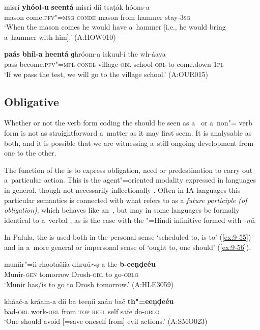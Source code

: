 \begin{exe}
\ex
\label{ex:9-53}
\gll misrí \textbf{yhóol-u} \textbf{seentá} misrí díi tsaṭák hóons-a \\
mason come.\textsc{pfv"=msg} \textsc{condh} mason from hammer stay-\textsc{3sg} \\
\glt `When the mason comes he would have a~hammer [i.e., he would bring a~hammer with him].' (A:HOW010)

\ex
\label{ex:9-54}
\gll \textbf{paás} \textbf{bhíl-a} \textbf{heentá}  ɡhróom-a iskuul-í the wh-áaya\\
pass become.\textsc{pfv"=mpl} \textsc{condl}  village-\textsc{obl} school-\textsc{obl} to come.down-\textsc{1pl}\\
\glt `If we pass the test, we will go to the village school.' (A:OUR015)
\end{exe}

\subsection{Obligative}
\label{subsec:9-2-3}

Whether or not the verb form coding the  should be seen as a~ or a~non"= verb form is not as straightforward a~matter as it may first seem. It is analysable as both, and it is possible that we are witnessing a~still ongoing development from one to the other. 



The function of the  is to express obligation, need or predestination to carry out a~particular action. This is the agent"=oriented modality expressed in languages in general, though not necessarily inflectionally \citep[177--187]{bybeeetal1994}. Often in IA languages this particular semantics is connected with what \citet[322]{masica1991} refers to as a \textit{future  participle (of obligation)}, which behaves like an~, but may in some languages be formally identical to a~verbal , as is the case with the \iliUrdu"=Hindi infinitive formed with \textit{-nā}. 



In Palula, the  is used both in the personal sense `scheduled to, is to' (\ref{ex:9-55}) and in a~more general or impersonal sense of `ought to, one should' (\ref{ex:9-56}).

\begin{exe}
\ex
\label{ex:9-55}
\gll muníir"=ii rhootašíia dhruú$\sim$ṣ-a the \textbf{b-eeṇḍeéu} \\
Munir-\textsc{gen } tomorrow Drosh-\textsc{obl} to go-\textsc{oblg} \\
\glt `Munir has/is to go to Drosh tomorrow.' (A:HLE3059)

\ex
\label{ex:9-56}
\gll kháač-a kráam-a díi ba teeṇíi zaán bač \textbf{th"=eeṇḍeéu} \\
bad-\textsc{obl} work-\textsc{obl} from \textsc{top} \textsc{refl} self safe do-\textsc{oblg} \\
\glt `One should avoid [=save oneself from] evil actions.' (A:SMO023)
\end{exe}

